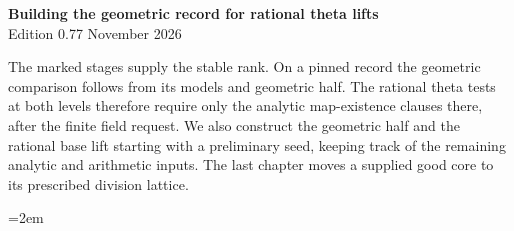 \begin{center}
{\Large\bfseries Building the geometric record for rational theta lifts}\\[4pt]
Edition 0.77  November 2026
\end{center}

The marked stages supply the stable rank. On a pinned record the
geometric comparison follows from its models and geometric half.
The rational theta tests at both levels therefore require only
the analytic map-existence clauses there, after the finite field
request. We also construct the geometric half and the rational
base lift starting with a preliminary seed, keeping track of the
remaining analytic and arithmetic inputs. The last chapter moves
a supplied good core to its prescribed division lattice.

\begingroup\emergencystretch=2em













\endgroup
